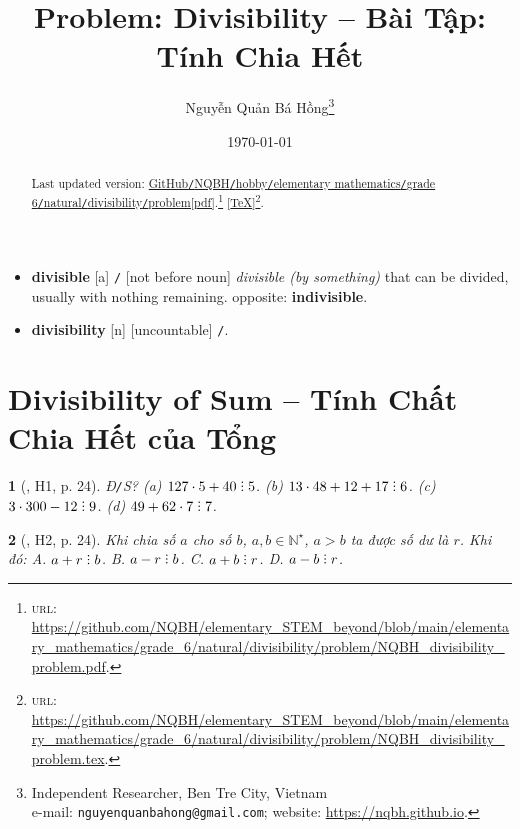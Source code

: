 \documentclass{article}
\title{Problem: Divisibility -- Bài Tập: Tính Chia Hết}
\author{Nguyễn Quản Bá Hồng\footnote{Independent Researcher, Ben Tre City, Vietnam\\e-mail: \texttt{nguyenquanbahong@gmail.com}; website: \url{https://nqbh.github.io}.}}
\date{\today}
\newtheorem{baitoan}{}
\DeclareRobustCommand{\divby}{%
	\mathrel{\vbox{\baselineskip.65ex\lineskiplimit0pt\hbox{.}\hbox{.}\hbox{.}}}%
}
\begin{document}
\maketitle
\begin{abstract}
	Last updated version: \href{https://github.com/NQBH/elementary_STEM_beyond/blob/main/elementary_mathematics/grade_6/natural/divisibility/problem/NQBH_divisibility_problem.pdf}{GitHub{\tt/}NQBH{\tt/}hobby{\tt/}elementary mathematics{\tt/}grade 6{\tt/}natural{\tt/}divisibility{\tt/}problem[pdf]}.\footnote{\textsc{url}: \url{https://github.com/NQBH/elementary_STEM_beyond/blob/main/elementary_mathematics/grade_6/natural/divisibility/problem/NQBH_divisibility_problem.pdf}.} [\href{https://github.com/NQBH/elementary_STEM_beyond/blob/main/elementary_mathematics/grade_6/natural/divisibility/problem/NQBH_divisibility_problem.tex}{\TeX}]\footnote{\textsc{url}: \url{https://github.com/NQBH/elementary_STEM_beyond/blob/main/elementary_mathematics/grade_6/natural/divisibility/problem/NQBH_divisibility_problem.tex}.}. 
\end{abstract}
\tableofcontents


\begin{itemize}\sf
	\item \textbf{divisible} [a] {\tt/} [not before noun] \textit{divisible (by something)} that can be divided, usually with nothing remaining. {\sc opposite}: \textbf{indivisible}.
	\item \textbf{divisibility}  [n] [uncountable] {\tt/}.
\end{itemize}

\section{Divisibility of Sum -- Tính Chất Chia Hết của Tổng}

\begin{baitoan}[\cite{Binh_boi_duong_Toan_6_tap_1}, H1, p. 24]
	{\rm Đ{\tt/}S? (a) $127\cdot5 + 40\divby5$. (b) $13\cdot48 + 12 + 17\divby6$. (c) $3\cdot300 - 12\divby9$. (d) $49 + 62\cdot7\divby7$.}
\end{baitoan}

\begin{baitoan}[\cite{Binh_boi_duong_Toan_6_tap_1}, H2, p. 24]
	Khi chia số $a$ cho số $b$, $a,b\in\mathbb{N}^\star$, $a > b$ ta được số dư là $r$. Khi đó: {\sf A.} $a + r\divby b$. {\sf B.} $a - r\divby b$. {\sf C.} $a + b\divby r$. {\sf D.} $a - b\divby r$.
\end{baitoan}
\end{document}

